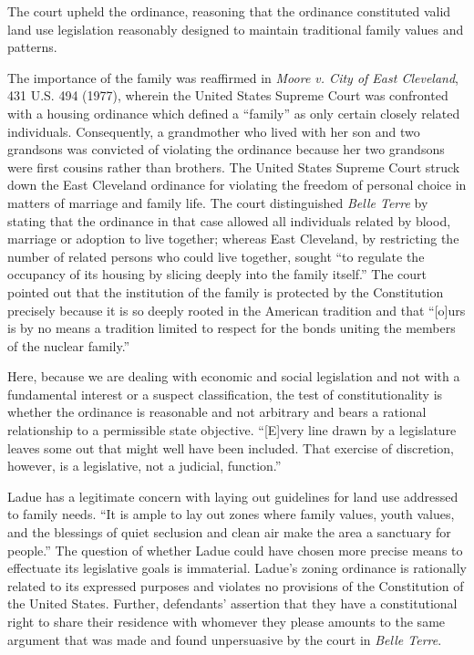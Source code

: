 The court upheld the ordinance, reasoning that the ordinance constituted valid
land use legislation reasonably designed to maintain traditional family values
and patterns.

The importance of the family was reaffirmed in \textit{Moore v. City of East
Cleveland}, 431 U.S. 494 (1977), wherein the United States Supreme Court was
confronted with a housing ordinance which defined a ``family'' as only certain
closely related individuals. Consequently, a grandmother who lived with her son
and two grandsons was convicted of violating the ordinance because her two
grandsons were first cousins rather than brothers. The United States Supreme
Court struck down the East Cleveland ordinance for violating the freedom of
personal choice in matters of marriage and family life. The court distinguished
\textit{Belle Terre} by stating that the ordinance in that case allowed all
individuals related by blood, marriage or adoption to live together; whereas
East Cleveland, by restricting the number of related persons who could live
together, sought ``to regulate the occupancy of its housing by slicing deeply
into the family itself.'' The court pointed out that the institution of the
family is protected by the Constitution precisely because it is so deeply rooted
in the American tradition and that ``[o]urs is by no means a tradition limited
to respect for the bonds uniting the members of the nuclear family.'' 

Here, because we are dealing with economic and social legislation and not with a
fundamental interest or a suspect classification, the test of constitutionality
is whether the ordinance is reasonable and not arbitrary and bears a rational
relationship to a permissible state objective. ``[E]very line drawn by a
legislature leaves some out that might well have been included. That exercise of
discretion, however, is a legislative, not a judicial, function.'' 

Ladue has a legitimate concern with laying out guidelines for land use addressed
to family needs. ``It is ample to lay out zones where family values, youth
values, and the blessings of quiet seclusion and clean air make the area a
sanctuary for people.'' The question of whether Ladue could have chosen more
precise means to effectuate its legislative goals is immaterial. Ladue's zoning
ordinance is rationally related to its expressed purposes and violates no
provisions of the Constitution of the United States. Further, defendants'
assertion that they have a constitutional right to share their residence with
whomever they please amounts to the same argument that was made and found
unpersuasive by the court in \textit{Belle Terre}.

